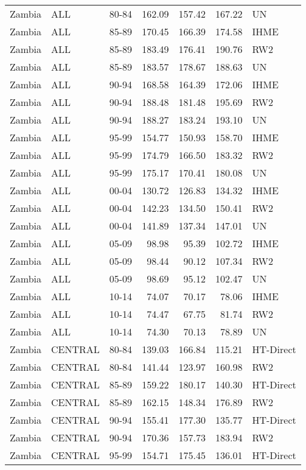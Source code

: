 \begin{longtable}{lllrrrl}
  Zambia & ALL & 80-84 & 162.09 & 157.42 & 167.22 & UN \\ 
  Zambia & ALL & 85-89 & 170.45 & 166.39 & 174.58 & IHME \\ 
  Zambia & ALL & 85-89 & 183.49 & 176.41 & 190.76 & RW2 \\ 
  Zambia & ALL & 85-89 & 183.57 & 178.67 & 188.63 & UN \\ 
  Zambia & ALL & 90-94 & 168.58 & 164.39 & 172.06 & IHME \\ 
  Zambia & ALL & 90-94 & 188.48 & 181.48 & 195.69 & RW2 \\ 
  Zambia & ALL & 90-94 & 188.27 & 183.24 & 193.10 & UN \\ 
  Zambia & ALL & 95-99 & 154.77 & 150.93 & 158.70 & IHME \\ 
  Zambia & ALL & 95-99 & 174.79 & 166.50 & 183.32 & RW2 \\ 
  Zambia & ALL & 95-99 & 175.17 & 170.41 & 180.08 & UN \\ 
  Zambia & ALL & 00-04 & 130.72 & 126.83 & 134.32 & IHME \\ 
  Zambia & ALL & 00-04 & 142.23 & 134.50 & 150.41 & RW2 \\ 
  Zambia & ALL & 00-04 & 141.89 & 137.34 & 147.01 & UN \\ 
  Zambia & ALL & 05-09 & 98.98 & 95.39 & 102.72 & IHME \\ 
  Zambia & ALL & 05-09 & 98.44 & 90.12 & 107.34 & RW2 \\ 
  Zambia & ALL & 05-09 & 98.69 & 95.12 & 102.47 & UN \\ 
  Zambia & ALL & 10-14 & 74.07 & 70.17 & 78.06 & IHME \\ 
  Zambia & ALL & 10-14 & 74.47 & 67.75 & 81.74 & RW2 \\ 
  Zambia & ALL & 10-14 & 74.30 & 70.13 & 78.89 & UN \\ 
  Zambia & CENTRAL & 80-84 & 139.03 & 166.84 & 115.21 & HT-Direct \\ 
  Zambia & CENTRAL & 80-84 & 141.44 & 123.97 & 160.98 & RW2 \\ 
  Zambia & CENTRAL & 85-89 & 159.22 & 180.17 & 140.30 & HT-Direct \\ 
  Zambia & CENTRAL & 85-89 & 162.15 & 148.34 & 176.89 & RW2 \\ 
  Zambia & CENTRAL & 90-94 & 155.41 & 177.30 & 135.77 & HT-Direct \\ 
  Zambia & CENTRAL & 90-94 & 170.36 & 157.73 & 183.94 & RW2 \\ 
  Zambia & CENTRAL & 95-99 & 154.71 & 175.45 & 136.01 & HT-Direct \\ 

\end{longtable}
